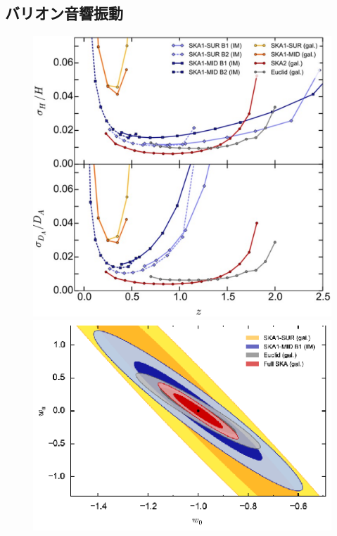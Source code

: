 \subsection{バリオン音響振動}\label{cosmology.s2.ss1}

\begin{figure}[t]
 \begin{minipage}{0.52\hsize}
 \begin{center}
   \includegraphics[width=1.0\linewidth]{cosmology/BAO_constraint.eps} 
 \end{center}
 \end{minipage}
 \begin{minipage}{0.52\hsize}
 \begin{center}
 \vspace{2.7cm}
   \includegraphics[width=1.0\linewidth]{cosmology/f2.eps} 

\end{center}
\end{minipage}
\end{figure}
